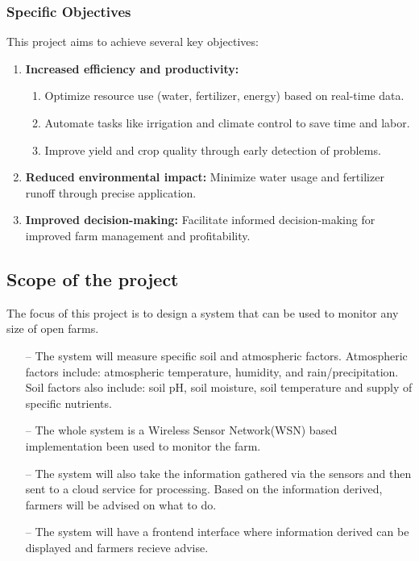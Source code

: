 \documentclass[12pt, a4paper]{article}
\begin{document}
\subsubsection{Specific Objectives}
This project aims to achieve several key objectives:\\
\begin{enumerate}
\item \textbf{Increased efficiency and productivity:}
\begin{enumerate}
 \item Optimize resource use (water, fertilizer, energy) based on real-time data.
 \item Automate tasks like irrigation and climate control to save time and labor.
 \item Improve yield and crop quality through early detection of problems.
\end{enumerate}
 
\item \textbf{Reduced environmental impact:} Minimize water usage and fertilizer runoff through precise application.\\
\item \textbf{Improved decision-making:} Facilitate informed decision-making for improved farm management and profitability.
\end{enumerate}

\newpage
\subsection{Scope of the project}
The focus of this project is to design a system that can be used to monitor any size of open farms.
\begin{itemize}
\item[--] The system will measure specific soil and atmospheric factors. Atmospheric factors include: atmospheric temperature, humidity, and rain/precipitation. Soil factors also include: soil pH, soil moisture, soil temperature and supply of specific nutrients.
\item[--] The whole system is a Wireless Sensor Network(WSN) based implementation been used to  monitor the farm.
\item[--] The system will also take the information gathered via the sensors and then sent to a cloud service for processing. Based on the information derived, farmers will be advised on what to do.
\item[--] The system will have a frontend interface where information derived can be displayed and farmers recieve advise.
\end{itemize}
\end{document}
